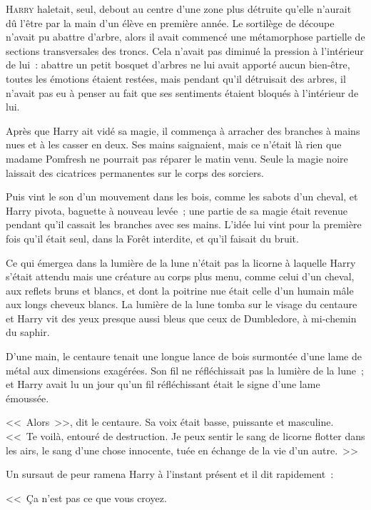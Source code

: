 
\lettrine{H}{arry} haletait, seul, debout au centre d'une zone plus détruite qu'elle n'aurait dû l'être par la main d'un élève en première année. Le sortilège de découpe n'avait pu abattre d'arbre, alors il avait commencé une métamorphose partielle de sections transversales des troncs. Cela n'avait pas diminué la pression à l'intérieur de lui~: abattre un petit bosquet d'arbres ne lui avait apporté aucun bien-être, toutes les émotions étaient restées, mais pendant qu'il détruisait des arbres, il n'avait pas eu à penser au fait que ses sentiments étaient bloqués à l'intérieur de lui.

Après que Harry ait vidé sa magie, il commença à arracher des branches à mains nues et à les casser en deux. Ses mains saignaient, mais ce n'était là rien que madame Pomfresh ne pourrait pas réparer le matin venu. Seule la magie noire laissait des cicatrices permanentes sur le corps des sorciers.

Puis vint le son d'un mouvement dans les bois, comme les sabots d'un cheval, et Harry pivota, baguette à nouveau levée~; une partie de sa magie était revenue pendant qu'il cassait les branches avec ses mains. L'idée lui vint pour la première fois qu'il était seul, dans la Forêt interdite, et qu'il faisait du bruit.

Ce qui émergea dans la lumière de la lune n'était pas la licorne à laquelle Harry s'était attendu mais une créature au corps plus menu, comme celui d'un cheval, aux reflets bruns et blancs, et dont la poitrine nue était celle d'un humain mâle aux longs cheveux blancs. La lumière de la lune tomba sur le visage du centaure et Harry vit des yeux presque aussi bleus que ceux de Dumbledore, à mi-chemin du saphir.

D'une main, le centaure tenait une longue lance de bois surmontée d'une lame de métal aux dimensions exagérées. Son fil ne réfléchissait pas la lumière de la lune~; et Harry avait lu un jour qu'un fil réfléchissant était le signe d'une lame émoussée.

<<~Alors~>>, dit le centaure. Sa voix était basse, puissante et masculine. <<~Te voilà, entouré de destruction. Je peux sentir le sang de licorne flotter dans les airs, le sang d'une chose innocente, tuée en échange de la vie d'un autre.~>>

Un sursaut de peur ramena Harry à l'instant présent et il dit rapidement~:

<<~Ça n'est pas ce que vous croyez.

